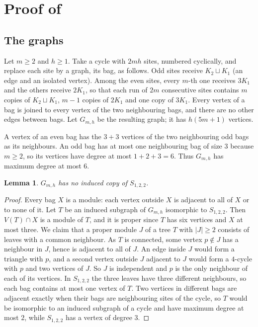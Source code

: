 \documentclass[11pt]{article}
\newtheorem{lemma}[theorem]{Lemma}
\theoremstyle{remark}
\begin{document}
\section{Proof of \texorpdfstring{}{Theorem 1.3}}\label{sec:sector}

\subsection{The graphs}

Let $m\ge2$ and $h\ge1$. Take a cycle with $2mh$ sites, numbered cyclically, and replace each site by a graph, its
bag, as follows. Odd sites receive $K_2\sqcup K_1$ (an edge and an isolated vertex). Among the even sites, every
$m$-th one receives $3K_1$ and the others receive $2K_1$, so that each run of $2m$ consecutive sites contains $m$
copies of $K_2\sqcup K_1$, $m-1$ copies of $2K_1$ and one copy of $3K_1$. Every vertex of a bag is joined to every
vertex of the two neighbouring bags, and there are no other edges between bags. Let $G_{m,h}$ be the resulting graph;
it has $h(5m+1)$ vertices.

A vertex of an even bag has the $3+3$ vertices of the two neighbouring odd bags as its neighbours. An odd bag has at
most one neighbouring bag of size $3$ because $m\ge2$, so its vertices have degree at most $1+2+3=6$. Thus $G_{m,h}$
has maximum degree at most $6$.

\begin{lemma}\label{lem:E}
$G_{m,h}$ has no induced copy of $S_{1,2,2}$.
\end{lemma}

\begin{proof}
Every bag $X$ is a module: each vertex outside $X$ is adjacent to all of $X$ or to none of it. Let $T$ be an induced
subgraph of $G_{m,h}$ isomorphic to $S_{1,2,2}$. Then $V(T)\cap X$ is a module of $T$, and it is proper since $T$ has
six vertices and $X$ at most three. We claim that a proper module $J$ of a tree $T$ with $|J|\ge2$ consists of
leaves with a common neighbour. As $T$ is connected, some vertex $p\notin J$ has a neighbour in $J$, hence is adjacent
to all of $J$. An edge inside $J$ would form a triangle with $p$, and a second vertex outside $J$ adjacent to $J$ would
form a $4$-cycle with $p$ and two vertices of $J$. So $J$ is independent and $p$ is the only neighbour of each of its
vertices. In $S_{1,2,2}$ the three leaves have three different neighbours, so each bag contains at most one vertex of
$T$. Two vertices in different bags are adjacent exactly when their bags are neighbouring sites of the cycle, so $T$
would be isomorphic to an induced subgraph of a cycle and have maximum degree at most $2$, while $S_{1,2,2}$ has a
vertex of degree $3$.
\end{proof}
\end{document}
